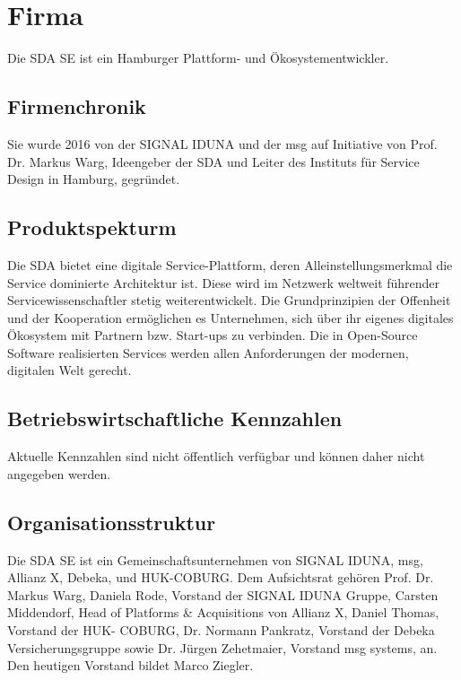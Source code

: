 \chapter{Firma}
\label{ch:firma}
Die SDA SE ist ein Hamburger Plattform- und Ökosystementwickler.

%
%
\section{Firmenchronik}
\label{sec:intro:firmenchronik}
Sie wurde 2016 von der SIGNAL IDUNA und der msg auf Initiative von Prof.
Dr. Markus Warg, Ideengeber der SDA und Leiter des Instituts für Service Design in Hamburg, gegründet.
%
%
\section{Produktspekturm}
\label{sec:intro:produktspekturm}
Die SDA bietet eine digitale Service-Plattform, deren Alleinstellungsmerkmal die Service dominierte Architektur ist.
Diese wird im Netzwerk weltweit führender Servicewissenschaftler stetig weiterentwickelt.
Die Grundprinzipien der Offenheit und der Kooperation ermöglichen es Unternehmen, sich über ihr eigenes digitales Ökosystem mit Partnern bzw. Start-ups zu verbinden.
Die in Open-Source Software realisierten Services werden allen Anforderungen der modernen, digitalen Welt gerecht.
%
%
\section{Betriebswirtschaftliche Kennzahlen}
\label{sec:intro:betrwirtschaftliche-kennzahlen}
Aktuelle Kennzahlen sind nicht öffentlich verfügbar und können daher nicht angegeben werden.

\section{Organisationsstruktur}
\label{sec:intro:organisationsstruktur}
Die SDA SE ist ein Gemeinschaftsunternehmen von SIGNAL IDUNA, msg, Allianz X, Debeka, und HUK-COBURG.
Dem Aufsichtsrat gehören Prof. Dr. Markus Warg, Daniela Rode, Vorstand der SIGNAL IDUNA Gruppe, Carsten Middendorf, Head of Platforms & Acquisitions von Allianz X, Daniel Thomas, Vorstand der HUK- COBURG, Dr. Normann Pankratz, Vorstand der Debeka Versicherungsgruppe sowie Dr. Jürgen Zehetmaier, Vorstand msg systems, an.
Den heutigen Vorstand bildet Marco Ziegler.

